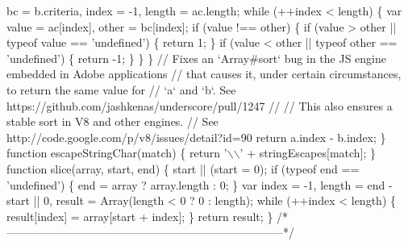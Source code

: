 \begin{DoxyCodeInclude}
\textcolor{stringliteral}{        bc = b.criteria,}
\textcolor{stringliteral}{        index = -1,}
\textcolor{stringliteral}{        length = ac.length;}
\textcolor{stringliteral}{}
\textcolor{stringliteral}{    while (++index < length) \{}
\textcolor{stringliteral}{      var value = ac[index],}
\textcolor{stringliteral}{          other = bc[index];}
\textcolor{stringliteral}{}
\textcolor{stringliteral}{      if (value !== other) \{}
\textcolor{stringliteral}{        if (value > other || typeof value == '}undefined\textcolor{stringliteral}{') \{}
\textcolor{stringliteral}{          return 1;}
\textcolor{stringliteral}{        \}}
\textcolor{stringliteral}{        if (value < other || typeof other == '}undefined\textcolor{stringliteral}{') \{}
\textcolor{stringliteral}{          return -1;}
\textcolor{stringliteral}{        \}}
\textcolor{stringliteral}{      \}}
\textcolor{stringliteral}{    \}}
\textcolor{stringliteral}{    // Fixes an `Array#sort` bug in the JS engine embedded in Adobe applications}
\textcolor{stringliteral}{    // that causes it, under certain circumstances, to return the same value for}
\textcolor{stringliteral}{    // `a` and `b`. See https://github.com/jashkenas/underscore/pull/1247}
\textcolor{stringliteral}{    //}
\textcolor{stringliteral}{    // This also ensures a stable sort in V8 and other engines.}
\textcolor{stringliteral}{    // See http://code.google.com/p/v8/issues/detail?id=90}
\textcolor{stringliteral}{    return a.index - b.index;}
\textcolor{stringliteral}{  \}}
\textcolor{stringliteral}{}
\textcolor{stringliteral}{  function escapeStringChar(match) \{}
\textcolor{stringliteral}{    return '}\(\backslash\)\(\backslash\)\textcolor{stringliteral}{' + stringEscapes[match];}
\textcolor{stringliteral}{  \}}
\textcolor{stringliteral}{}
\textcolor{stringliteral}{  function slice(array, start, end) \{}
\textcolor{stringliteral}{    start || (start = 0);}
\textcolor{stringliteral}{    if (typeof end == '}undefined\textcolor{stringliteral}{') \{}
\textcolor{stringliteral}{      end = array ? array.length : 0;}
\textcolor{stringliteral}{    \}}
\textcolor{stringliteral}{    var index = -1,}
\textcolor{stringliteral}{        length = end - start || 0,}
\textcolor{stringliteral}{        result = Array(length < 0 ? 0 : length);}
\textcolor{stringliteral}{}
\textcolor{stringliteral}{    while (++index < length) \{}
\textcolor{stringliteral}{      result[index] = array[start + index];}
\textcolor{stringliteral}{    \}}
\textcolor{stringliteral}{    return result;}
\textcolor{stringliteral}{  \}}
\textcolor{stringliteral}{}
\textcolor{stringliteral}{  /*--------------------------------------------------------------------------*/}

\end{DoxyCodeInclude}
